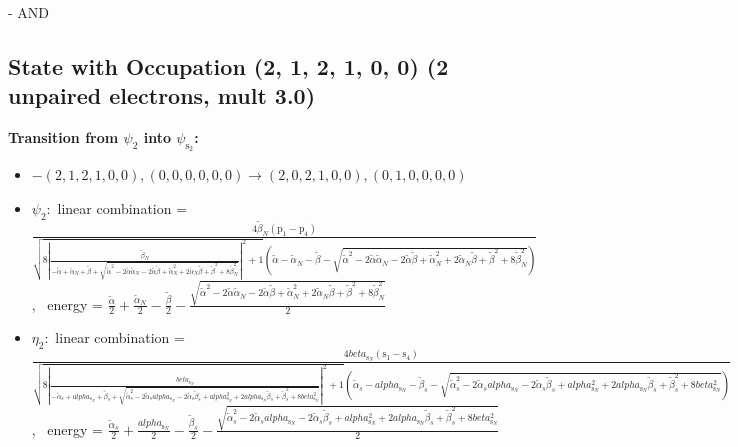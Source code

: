 \documentclass[12pt,a4paper]{article}
\begin{document}
 -  AND 
\subsection*{State with Occupation (2, 1, 2, 1, 0, 0) (2 unpaired electrons, mult 3.0)}
        \noindent\textbf{Transition from $\psi_{2}$ into $\psi_{\text{s}_{2}}$:}
        \begin{itemize}
            \item $- (2, 1, 2, 1, 0, 0), (0, 0, 0, 0, 0, 0) \rightarrow (2, 0, 2, 1, 0, 0), (0, 1, 0, 0, 0, 0)$
        
            \item $\psi_{2}:$ linear combination = $\frac{4 \tilde{\beta}_{N} \left(\text{p}_{1} - \text{p}_{4}\right)}{\sqrt{8 \left|{\frac{\tilde{\beta}_{N}}{- \tilde{\alpha} + \tilde{\alpha}_{N} + \tilde{\beta} + \sqrt{\tilde{\alpha}^{2} - 2 \tilde{\alpha} \tilde{\alpha}_{N} - 2 \tilde{\alpha} \tilde{\beta} + \tilde{\alpha}_{N}^{2} + 2 \tilde{\alpha}_{N} \tilde{\beta} + \tilde{\beta}^{2} + 8 \tilde{\beta}_{N}^{2}}}}\right|^{2} + 1} \left(\tilde{\alpha} - \tilde{\alpha}_{N} - \tilde{\beta} - \sqrt{\tilde{\alpha}^{2} - 2 \tilde{\alpha} \tilde{\alpha}_{N} - 2 \tilde{\alpha} \tilde{\beta} + \tilde{\alpha}_{N}^{2} + 2 \tilde{\alpha}_{N} \tilde{\beta} + \tilde{\beta}^{2} + 8 \tilde{\beta}_{N}^{2}}\right)}$, \
            energy = $\frac{\tilde{\alpha}}{2} + \frac{\tilde{\alpha}_{N}}{2} - \frac{\tilde{\beta}}{2} - \frac{\sqrt{\tilde{\alpha}^{2} - 2 \tilde{\alpha} \tilde{\alpha}_{N} - 2 \tilde{\alpha} \tilde{\beta} + \tilde{\alpha}_{N}^{2} + 2 \tilde{\alpha}_{N} \tilde{\beta} + \tilde{\beta}^{2} + 8 \tilde{\beta}_{N}^{2}}}{2}$
            
            \item $\eta_{2}:$ linear combination = $\frac{4 beta_{\text{s}_N} \left(\text{s}_{1} - \text{s}_{4}\right)}{\sqrt{8 \left|{\frac{beta_{\text{s}_N}}{- \tilde{\alpha}_{s} + alpha_{\text{s}_N} + \tilde{\beta}_{s} + \sqrt{\tilde{\alpha}_{s}^{2} - 2 \tilde{\alpha}_{s} alpha_{\text{s}_N} - 2 \tilde{\alpha}_{s} \tilde{\beta}_{s} + alpha_{\text{s}_N}^{2} + 2 alpha_{\text{s}_N} \tilde{\beta}_{s} + \tilde{\beta}_{s}^{2} + 8 beta_{\text{s}_N}^{2}}}}\right|^{2} + 1} \left(\tilde{\alpha}_{s} - alpha_{\text{s}_N} - \tilde{\beta}_{s} - \sqrt{\tilde{\alpha}_{s}^{2} - 2 \tilde{\alpha}_{s} alpha_{\text{s}_N} - 2 \tilde{\alpha}_{s} \tilde{\beta}_{s} + alpha_{\text{s}_N}^{2} + 2 alpha_{\text{s}_N} \tilde{\beta}_{s} + \tilde{\beta}_{s}^{2} + 8 beta_{\text{s}_N}^{2}}\right)}$, \
            energy = $\frac{\tilde{\alpha}_{s}}{2} + \frac{alpha_{\text{s}_N}}{2} - \frac{\tilde{\beta}_{s}}{2} - \frac{\sqrt{\tilde{\alpha}_{s}^{2} - 2 \tilde{\alpha}_{s} alpha_{\text{s}_N} - 2 \tilde{\alpha}_{s} \tilde{\beta}_{s} + alpha_{\text{s}_N}^{2} + 2 alpha_{\text{s}_N} \tilde{\beta}_{s} + \tilde{\beta}_{s}^{2} + 8 beta_{\text{s}_N}^{2}}}{2}$
            

\end{itemize}
\end{document}
